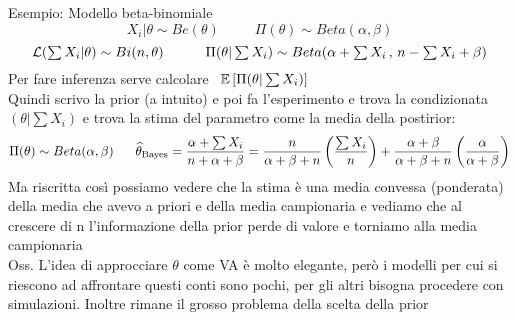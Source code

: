 Esempio: Modello beta-binomiale
\[
X_i|\theta \sim Be(\theta) \hspace{30pt} \Pi(\theta) \sim Beta(\alpha,\beta)
\]
\[
\mathcal L(\textstyle\sum X_i | \theta) \sim Bi (n,\theta) \hspace{30pt} \Pi(\theta | \sum X_i) \sim Beta (\alpha +  \sum X_i \, , \, n - \sum X_i + \beta)
\]
Per fare inferenza serve calcolare \ $\mathbb{E} \left[ \Pi(\theta | \sum X_i) \right]$\\
Quindi scrivo la prior (a intuito) e poi fa l'esperimento e trova la condizionata $(\theta | \sum X_i)$  e trova la stima del parametro come la media della postirior:
\[
\Pi(\theta)\sim Beta (\alpha,\beta) \ \ \ \ \ \hat{\theta}_{\text{Bayes}}=\frac{\alpha + \sum X_i}{n+\alpha + \beta} = \frac{n}{\alpha + \beta +n}\O\frac{\sum X_i}{n}\C + \frac{\alpha+\beta}{\alpha +\beta +n} \O\frac{\alpha}{\alpha+\beta}\C
\]
Ma riscritta così possiamo vedere che la stima è una media convessa (ponderata) della media che avevo a priori e della media campionaria e vediamo che al crescere di n l'informazione della prior perde di valore e torniamo alla media campionaria\\


Oss. L'idea di approcciare $\theta$ come VA è molto elegante, però i modelli per cui si riescono ad affrontare questi conti sono pochi, per gli altri bisogna procedere con simulazioni. Inoltre rimane il grosso problema della scelta della prior





